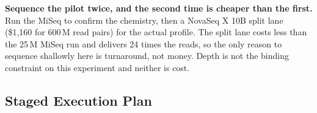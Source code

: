 \begin{keybox}
\textbf{Sequence the pilot twice, and the second time is cheaper than the first.}
Run the MiSeq to confirm the chemistry, then a NovaSeq X 10B split lane
(\$1{,}160 for 600\,M read pairs) for the actual profile. The split lane costs
less than the 25\,M MiSeq run and delivers 24 times the reads, so the only
reason to sequence shallowly here is turnaround, not money. Depth is not the
binding constraint on this experiment and neither is cost.
\end{keybox}

\subsection{Staged Execution Plan}
\label{sec:staging}


